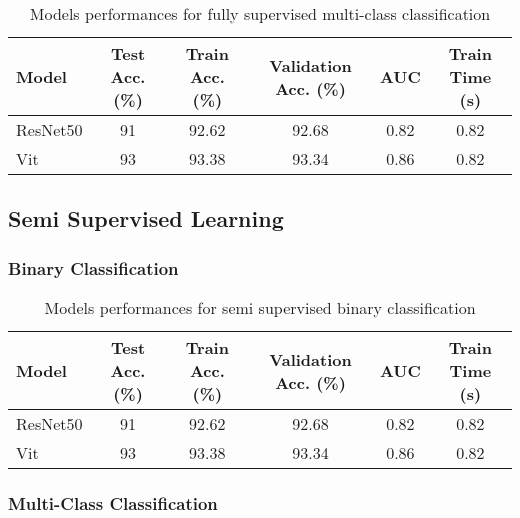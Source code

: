 \documentclass{article}
\begin{document}
\renewcommand{\arraystretch}{1.2} 
\begin{table}[h!] %
    \centering %
    \caption{Models performances for fully supervised multi-class classification} %
    \label{tab:fully_multi_perf} %
    \begin{tabular}{|l|c|c|c|c|c|}
        \hline
        Model & Test Acc. (\%) & Train Acc. (\%) & Validation Acc. (\%) & AUC & Train Time (s) \\
        \hline
        ResNet50 & 91 & 92.62 & 92.68 & 0.82 & 0.82 \\
        Vit & 93 & 93.38 & 93.34 & 0.86 & 0.82 \\
        \hline
    \end{tabular}
\end{table}

\subsection{Semi Supervised Learning}

\subsubsection{Binary Classification}

\renewcommand{\arraystretch}{1.2} 
\begin{table}[h!] %
    \centering %
    \caption{Models performances for semi supervised binary classification} %
    \label{tab:semi_binary_perf} %
    \begin{tabular}{|l|c|c|c|c|c|}
        \hline
        Model & Test Acc. (\%) & Train Acc. (\%) & Validation Acc. (\%) & AUC & Train Time (s) \\
        \hline
        ResNet50 & 91 & 92.62 & 92.68 & 0.82 & 0.82 \\
        Vit & 93 & 93.38 & 93.34 & 0.86 & 0.82 \\
        \hline
    \end{tabular}
\end{table}

\subsubsection{Multi-Class Classification}
\end{document}

